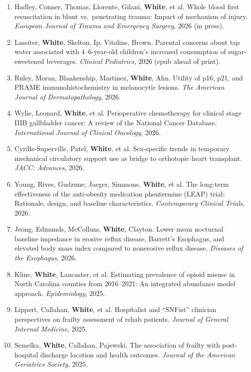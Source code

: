 \documentclass[11pt, letterpaper]{article}
\begin{document}
{\footnotesize
\begin{enumerate}[leftmargin=1.5em, itemsep=1pt, parsep=0pt, topsep=0pt]
  \item Hadley, Conner, Thomas, Llorente, Gilani, \textbf{White}, et al. Whole blood first resuscitation in blunt vs.\ penetrating trauma: Impact of mechanism of injury. \emph{European Journal of Trauma and Emergency Surgery}, 2026 (in press).
  \item Lassiter, \textbf{White}, Skelton, Ip, Vitolins, Brown. Parental concerns about tap water associated with 4--6-year-old children's increased consumption of sugar-sweetened beverages. \emph{Clinical Pediatrics}, 2026 (epub ahead of print).
  \item Ruley, Moran, Blankenship, Martinez, \textbf{White}, Ahn. Utility of p16, p21, and PRAME immunohistochemistry in melanocytic lesions. \emph{The American Journal of Dermatopathology}, 2026.
  \item Wylie, Leonard, \textbf{White}, et al. Perioperative chemotherapy for clinical stage IIIB gallbladder cancer: A review of the National Cancer Database. \emph{International Journal of Clinical Oncology}, 2026.
  \item Cyrille-Superville, Patel, \textbf{White}, et al. Sex-specific trends in temporary mechanical circulatory support use as bridge to orthotopic heart transplant. \emph{JACC: Advances}, 2026.
  \item Young, Rives, Gudzune, Jaeger, Simmons, \textbf{White}, et al. The long-term effectiveness of the anti-obesity medication phentermine (LEAP) trial: Rationale, design, and baseline characteristics. \emph{Contemporary Clinical Trials}, 2026.
  \item Jeong, Edmunds, McCollum, \textbf{White}, Clayton. Lower mean nocturnal baseline impedance in erosive reflux disease, Barrett's Esophagus, and elevated body mass index compared to nonerosive reflux disease. \emph{Diseases of the Esophagus}, 2026.
  \item Kline, \textbf{White}, Lancaster, et al. Estimating prevalence of opioid misuse in North Carolina counties from 2016--2021: An integrated abundance model approach. \emph{Epidemiology}, 2025.
  \item Lippert, Callahan, \textbf{White}, et al. Hospitalist and ``SNFist'' clinician perspectives on frailty assessment of rehab patients. \emph{Journal of General Internal Medicine}, 2025.
  \item Semelka, \textbf{White}, Callahan, Pajewski. The association of frailty with post-hospital discharge location and health outcomes. \emph{Journal of the American Geriatrics Society}, 2025.

\end{enumerate}}
\end{document}
